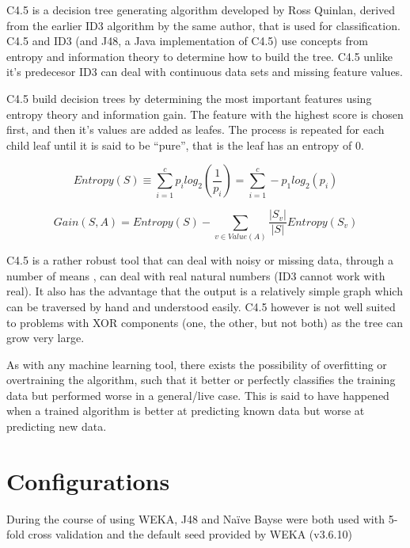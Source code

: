 \documentclass[10pt]{article}
\begin{document}
      C4.5 is a decision tree generating algorithm developed by Ross Quinlan, derived from the earlier ID3 algorithm by the same author, that is used for classification. C4.5 and ID3 (and J48, a Java implementation of C4.5) use concepts from entropy and information theory to determine how to build the tree. C4.5 unlike it's predecesor ID3 can deal with continuous data sets\cite{quinlan_c4.5_improved} and missing feature values. 

      C4.5 build decision trees by determining the most important features using entropy theory and information gain. The feature with the highest score is chosen first, and then it's values are added as leafes. The process is repeated for each child leaf until it is said to be ``pure'', that is the leaf has an entropy of 0.

      \begin{equation*}
        Entropy(S) \equiv
          \sum^{c}_{i=1}p_i log_2 \left(\frac{1}{p_i}\right) =
          \sum^{c}_{i=1}-p_1 log_2 \left(p_i\right)
      \end{equation*}

      \begin{equation*}
        Gain\left(S, A\right) = Entropy\left(S\right) - \sum_{v \in Value\left(A\right)} \frac{|S_v|}{|S|}Entropy\left(S_v\right)
      \end{equation*}

      C4.5 is a rather robust tool that can deal with noisy or missing data, through a number of means \cite{quinlan_c4.5}, can deal with real natural numbers (ID3 cannot work with real). It also has the advantage that the output is a relatively simple graph which can be traversed by hand and understood easily. C4.5 however is not well suited to problems with XOR components (one, the other, but not both) as the tree can grow very large.

      As with any machine learning tool, there exists the possibility of overfitting or overtraining the algorithm, such that it better or perfectly classifies the training data but performed worse in a general/live case. This is said to have happened when a trained algorithm is better at predicting known data but worse at predicting new data. \\

  \section{Configurations}

    During the course of using WEKA, J48 and Naïve Bayse were both used with 5-fold cross validation and the default seed provided by WEKA (v3.6.10)
\end{document}
